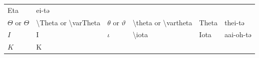 \documentclass[
]{book}
\begin{document}
\begin{longtable}[]{@{}llllll@{}}
\begin{minipage}[t]{0.06\columnwidth}
Eta\strut
\end{minipage} & \begin{minipage}[t]{0.08\columnwidth}\raggedright
ei-tə\strut
\end{minipage}\tabularnewline
\begin{minipage}[t]{0.18\columnwidth}\raggedright
\(\Theta\) or \(\varTheta\)\strut
\end{minipage} & \begin{minipage}[t]{0.17\columnwidth}\raggedright
\textbackslash Theta or \textbackslash varTheta\strut
\end{minipage} & \begin{minipage}[t]{0.18\columnwidth}\raggedright
\(\theta\) or \(\vartheta\)\strut
\end{minipage} & \begin{minipage}[t]{0.17\columnwidth}\raggedright
\textbackslash theta or \textbackslash vartheta\strut
\end{minipage} & \begin{minipage}[t]{0.06\columnwidth}\raggedright
Theta\strut
\end{minipage} & \begin{minipage}[t]{0.08\columnwidth}\raggedright
thei-tə\strut
\end{minipage}\tabularnewline
\begin{minipage}[t]{0.18\columnwidth}\raggedright
\(Ι\)\strut
\end{minipage} & \begin{minipage}[t]{0.17\columnwidth}\raggedright
Ι\strut
\end{minipage} & \begin{minipage}[t]{0.18\columnwidth}\raggedright
\(\iota\)\strut
\end{minipage} & \begin{minipage}[t]{0.17\columnwidth}\raggedright
\textbackslash iota\strut
\end{minipage} & \begin{minipage}[t]{0.06\columnwidth}\raggedright
Iota\strut
\end{minipage} & \begin{minipage}[t]{0.08\columnwidth}\raggedright
aai-oh-tə\strut
\end{minipage}\tabularnewline
\begin{minipage}[t]{0.18\columnwidth}\raggedright
\(Κ\)\strut
\end{minipage} & \begin{minipage}[t]{0.17\columnwidth}\raggedright
Κ\strut
\end{minipage} & \begin{minipage}[t]{0.18\columnwidth}\raggedright

\end{minipage}
\end{longtable}
\end{document}
